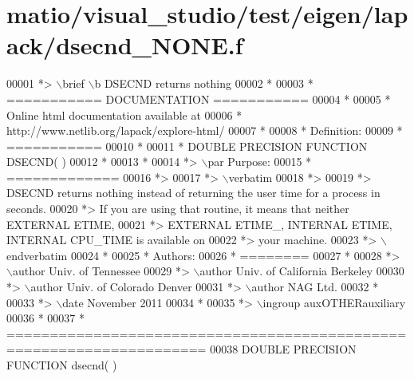 \hypertarget{matio_2visual__studio_2test_2eigen_2lapack_2dsecnd___n_o_n_e_8f_source}{}\section{matio/visual\+\_\+studio/test/eigen/lapack/dsecnd\+\_\+\+N\+O\+NE.f}
\label{matio_2visual__studio_2test_2eigen_2lapack_2dsecnd___n_o_n_e_8f_source}

\begin{DoxyCode}
00001 \textcolor{comment}{*> \(\backslash\)brief \(\backslash\)b DSECND returns nothing}
00002 \textcolor{comment}{*}
00003 \textcolor{comment}{*  =========== DOCUMENTATION ===========}
00004 \textcolor{comment}{*}
00005 \textcolor{comment}{* Online html documentation available at }
00006 \textcolor{comment}{*            http://www.netlib.org/lapack/explore-html/ }
00007 \textcolor{comment}{*}
00008 \textcolor{comment}{*  Definition:}
00009 \textcolor{comment}{*  ===========}
00010 \textcolor{comment}{*}
00011 \textcolor{comment}{*      DOUBLE PRECISION FUNCTION DSECND( )}
00012 \textcolor{comment}{*  }
00013 \textcolor{comment}{*}
00014 \textcolor{comment}{*> \(\backslash\)par Purpose:}
00015 \textcolor{comment}{*  =============}
00016 \textcolor{comment}{*>}
00017 \textcolor{comment}{*> \(\backslash\)verbatim}
00018 \textcolor{comment}{*>}
00019 \textcolor{comment}{*>  DSECND returns nothing instead of returning the user time for a process in seconds.}
00020 \textcolor{comment}{*>  If you are using that routine, it means that neither EXTERNAL ETIME,}
00021 \textcolor{comment}{*>  EXTERNAL ETIME\_, INTERNAL ETIME, INTERNAL CPU\_TIME is available  on}
00022 \textcolor{comment}{*>  your machine.}
00023 \textcolor{comment}{*> \(\backslash\)endverbatim}
00024 \textcolor{comment}{*}
00025 \textcolor{comment}{*  Authors:}
00026 \textcolor{comment}{*  ========}
00027 \textcolor{comment}{*}
00028 \textcolor{comment}{*> \(\backslash\)author Univ. of Tennessee }
00029 \textcolor{comment}{*> \(\backslash\)author Univ. of California Berkeley }
00030 \textcolor{comment}{*> \(\backslash\)author Univ. of Colorado Denver }
00031 \textcolor{comment}{*> \(\backslash\)author NAG Ltd. }
00032 \textcolor{comment}{*}
00033 \textcolor{comment}{*> \(\backslash\)date November 2011}
00034 \textcolor{comment}{*}
00035 \textcolor{comment}{*> \(\backslash\)ingroup auxOTHERauxiliary}
00036 \textcolor{comment}{*}
00037 \textcolor{comment}{*  =====================================================================}
00038 \textcolor{keyword}{      DOUBLE PRECISION }\textcolor{keyword}{FUNCTION }dsecnd( )

\end{DoxyCode}
